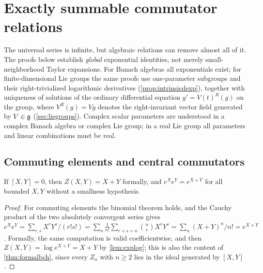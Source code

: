\section{Exactly summable commutator relations}\label{sec:special}
The universal series is infinite, but algebraic relations can remove almost
all of it. The proofs below establish \emph{global} exponential identities,
not merely small-neighborhood Taylor expansions. For Banach algebras all
exponentials exist; for finite-dimensional Lie groups the same proofs use
one-parameter subgroups and their right-trivialized logarithmic derivatives
(\cref{prop:intrinsicdexp}), together with uniqueness of solutions of the
ordinary differential equation $g'=V(t)^R(g)$ on the group, where
$V^R(g)=Vg$ denotes the right-invariant vector field generated by $V\in\mathfrak{g}$
(\cref{sec:liegroups}). Complex
scalar parameters are understood in a complex Banach algebra or complex Lie
group; in a real Lie group all parameters and linear combinations must be
real.

\subsection{Commuting elements and central commutators}
\begin{proposition}\label{prop:commuting}
If $[X,Y]=0$, then $Z(X,Y)=X+Y$ formally, and $e^Xe^Y=e^{X+Y}$ for all
bounded $X,Y$ without a smallness hypothesis.
\end{proposition}
\begin{proof}
For commuting elements the binomial theorem holds, and the Cauchy product
of the two absolutely convergent series gives
$e^Xe^Y=\sum_{r,s}X^rY^s/(r!s!)=\sum_n\frac1{n!}\sum_{r+s=n}\binom nrX^rY^s
=\sum_n(X+Y)^n/n!=e^{X+Y}$. Formally, the same computation is valid
coefficientwise, and then $Z(X,Y)=\log e^{X+Y}=X+Y$ by \cref{lem:explog};
this is also the content of \cref{thm:formalbch}, since every $Z_n$ with
$n\geq2$ lies in the ideal generated by $[X,Y]$.
\end{proof}

